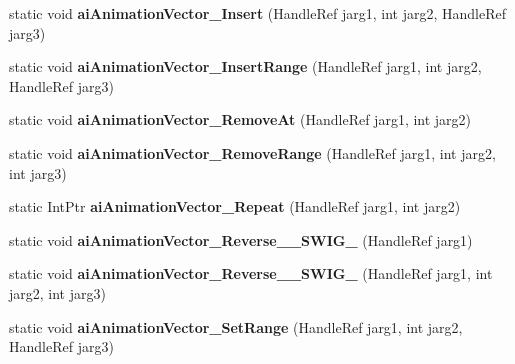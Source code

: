\begin{DoxyCompactItemize}
\item 
\hypertarget{class_assimp_p_i_n_v_o_k_e_ae261d6f9ff92d1c255a015947241e006}{static void {\bfseries ai\+Animation\+Vector\+\_\+\+Insert} (Handle\+Ref jarg1, int jarg2, Handle\+Ref jarg3)}\label{class_assimp_p_i_n_v_o_k_e_ae261d6f9ff92d1c255a015947241e006}

\item 
\hypertarget{class_assimp_p_i_n_v_o_k_e_a74c29c219ef9b2c4e2eac4a4f420f311}{static void {\bfseries ai\+Animation\+Vector\+\_\+\+Insert\+Range} (Handle\+Ref jarg1, int jarg2, Handle\+Ref jarg3)}\label{class_assimp_p_i_n_v_o_k_e_a74c29c219ef9b2c4e2eac4a4f420f311}

\item 
\hypertarget{class_assimp_p_i_n_v_o_k_e_a2af562c684b8c512ac2ea9e3ceb356c3}{static void {\bfseries ai\+Animation\+Vector\+\_\+\+Remove\+At} (Handle\+Ref jarg1, int jarg2)}\label{class_assimp_p_i_n_v_o_k_e_a2af562c684b8c512ac2ea9e3ceb356c3}

\item 
\hypertarget{class_assimp_p_i_n_v_o_k_e_a00cc1847ba4ee11ec699b8d3c73ab8da}{static void {\bfseries ai\+Animation\+Vector\+\_\+\+Remove\+Range} (Handle\+Ref jarg1, int jarg2, int jarg3)}\label{class_assimp_p_i_n_v_o_k_e_a00cc1847ba4ee11ec699b8d3c73ab8da}

\item 
\hypertarget{class_assimp_p_i_n_v_o_k_e_a0b1d19b4e0ec8ad6880ab045da921b7f}{static Int\+Ptr {\bfseries ai\+Animation\+Vector\+\_\+\+Repeat} (Handle\+Ref jarg1, int jarg2)}\label{class_assimp_p_i_n_v_o_k_e_a0b1d19b4e0ec8ad6880ab045da921b7f}

\item 
\hypertarget{class_assimp_p_i_n_v_o_k_e_a79b56eb53f668e69fc60e4099cb0856e}{static void {\bfseries ai\+Animation\+Vector\+\_\+\+Reverse\+\_\+\+\_\+\+S\+W\+I\+G\+\_} (Handle\+Ref jarg1)}\label{class_assimp_p_i_n_v_o_k_e_a79b56eb53f668e69fc60e4099cb0856e}

\item 
\hypertarget{class_assimp_p_i_n_v_o_k_e_a189412f3792d1eb478541c1287a48d90}{static void {\bfseries ai\+Animation\+Vector\+\_\+\+Reverse\+\_\+\+\_\+\+S\+W\+I\+G\+\_} (Handle\+Ref jarg1, int jarg2, int jarg3)}\label{class_assimp_p_i_n_v_o_k_e_a189412f3792d1eb478541c1287a48d90}

\item 
\hypertarget{class_assimp_p_i_n_v_o_k_e_af51dbf43d44f76a2a2c565e0e58aa6f9}{static void {\bfseries ai\+Animation\+Vector\+\_\+\+Set\+Range} (Handle\+Ref jarg1, int jarg2, Handle\+Ref jarg3)}\label{class_assimp_p_i_n_v_o_k_e_af51dbf43d44f76a2a2c565e0e58aa6f9}


\end{DoxyCompactItemize}
